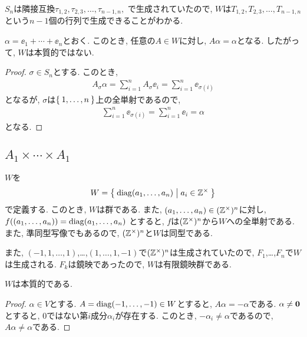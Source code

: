 $S_n$は隣接互換$\tau_{1,2},\tau_{2,3},\ldots,\tau_{n-1,n},$
で生成されていたので,
$W$は$T_{1,2},T_{2,3},\ldots,T_{n-1,n}$という$n-1$個の行列で生成できることがわかる.


\begin{prop}
$\alpha=\ee_1+\cdots+\ee_n$とおく.
このとき, 任意の$A\in W$に対し,
$A\alpha=\alpha$となる.
したがって, $W$は本質的ではない.
\end{prop}
\begin{proof}
  $\sigma\in S_n$とする.
  このとき,
  \begin{align*}
    A_\sigma \alpha=\sum_{i=1}^{n}A_\sigma \ee_i=\sum_{i=1}^{n} \ee_{\sigma(i)}
  \end{align*}
  となるが, $\sigma$は$\Set{1,\ldots,n}$上の全単射であるので,
  \begin{align*}
    \sum_{i=1}^{n} \ee_{\sigma(i)}=\sum_{i=1}^{n} \ee_i=\alpha
  \end{align*}
  となる.
\end{proof}


\subsection{$A_1\times \cdots \times A_1$}
\label{ex:a1n:grp}
$W$を
\begin{align*}
 W= \Set{\operatorname{diag}(a_1,\ldots,a_n)|a_i\in \mathbb{Z}^\times}
\end{align*}
で定義する.
このとき, $W$は群である.
また,
$(a_1,\ldots,a_n)\in (\mathbb{Z}^\times)^n$に対し,
$f((a_1,\ldots,a_n))=\operatorname{diag}(a_1,\ldots,a_n)$
とすると,
$f$は$(\mathbb{Z}^\times)^n$から$W$への全単射である.
また, 準同型写像でもあるので,
$(\mathbb{Z}^\times)^n$と$W$は同型である.

また, $(-1,1,\ldots,1)$,\ldots,$(1,\ldots,1,-1)$で$ (\mathbb{Z}^\times)^n$は生成されていたので,
$F_1$,\ldots,$F_n$で$W$は生成される.
$F_k$は鏡映であったので,
$W$は有限鏡映群である.

\begin{prop}
  $W$は本質的である.
\end{prop}
\begin{proof}
  $\alpha\in V$とする.
  $A=\operatorname{diag}(-1,\ldots,-1)\in W$とすると,
  $A\alpha=-\alpha$である.
  $\alpha\neq \boldsymbol{0}$とすると,
  $0$ではない第$i$成分$\alpha_i$が存在する.
  このとき, $-\alpha_i\neq \alpha$であるので,
  $A\alpha\neq \alpha$である.
\end{proof}


